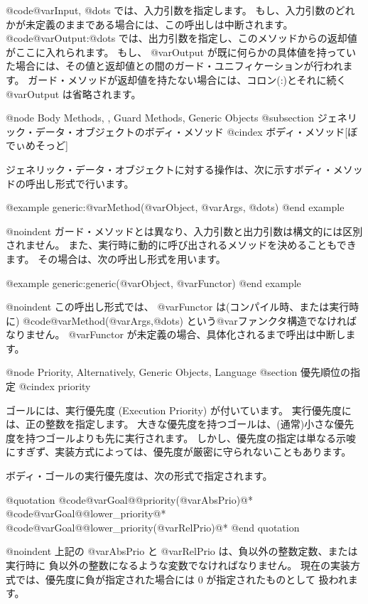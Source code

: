 @code{@var{Input}, @dots{}} では、入力引数を指定します。
もし、入力引数のどれかが未定義のままである場合には、この呼出しは中断されます。
@code{@var{Output}:@dots{}} では、出力引数を指定し、このメソッドからの返却値がここに入れられます。
もし、 @var{Output} が既に何らかの具体値を持っていた場合には、その値と返却値との間のガード・ユニフィケーションが行われます。
ガード・メソッドが返却値を持たない場合には、コロン(:)とそれに続く @var{Output} は省略されます。

@node Body Methods,  , Guard Methods, Generic Objects
@subsection ジェネリック・データ・オブジェクトのボディ・メソッド
@cindex ボディ・メソッド[ぼでぃめそっど]

ジェネリック・データ・オブジェクトに対する操作は、次に示すボディ・メソッドの呼出し形式で行います。

@example
generic:@var{Method}(@var{Object}, @var{Args}, @dots{})
@end example

@noindent
ガード・メソッドとは異なり、入力引数と出力引数は構文的には区別されません。
また、実行時に動的に呼び出されるメソッドを決めることもできます。
その場合は、次の呼出し形式を用います。

@example
generic:generic(@var{Object}, @var{Functor})
@end example

@noindent
この呼出し形式では、 @var{Functor} は(コンパイル時、または実行時に) @code{@var{Method}(@var{Args},@dots{})} という@var{ファンクタ}構造でなければなりません。
@var{Functor} が未定義の場合、具体化されるまで呼出は中断します。

@node Priority, Alternatively, Generic Objects, Language
@section 優先順位の指定
@cindex priority

ゴールには、実行優先度 (Execution Priority) が付いています。
実行優先度には、正の整数を指定します。
大きな優先度を持つゴールは、(通常)小さな優先度を持つゴールよりも先に実行されます。
しかし、優先度の指定は単なる示唆にすぎず、実装方式によっては、優先度が厳密に守られないこともあります。

ボディ・ゴールの実行優先度は、次の形式で指定されます。

@quotation
        @code{@var{Goal}@@priority(@var{AbsPrio})}@*
        @code{@var{Goal}@@lower_priority}@*
        @code{@var{Goal}@@lower_priority(@var{RelPrio})}@*
@end quotation

@noindent
上記の @var{AbsPrio} と @var{RelPrio} は、負以外の整数定数、または実行時に
負以外の整数になるような変数でなければなりません。
現在の実装方式では、優先度に負が指定された場合には 0 が指定されたものとして
扱われます。

